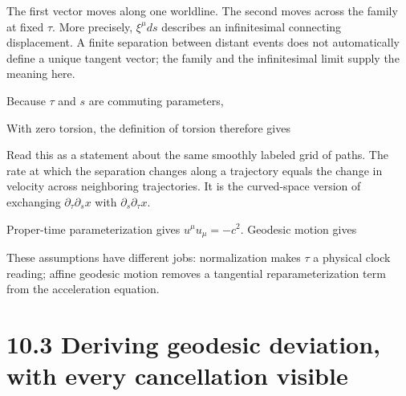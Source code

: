 \documentclass[
  11pt,
  letterpaper,
  oneside,
  openany]{scrbook}
\begin{document}
The first vector moves along one worldline. The second moves across the
family at fixed \(\tau\). More precisely, \(\xi^\mu ds\) describes an
infinitesimal connecting displacement. A finite separation between
distant events does not automatically define a unique tangent vector;
the family and the infinitesimal limit supply the meaning here.

Because \(\tau\) and \(s\) are commuting parameters,

\begin{center}
\begingroup
{}
\ifdim\wd\grmathbox>\linewidth
\resizebox{\linewidth}{!}{\usebox{\grmathbox}}
\else\usebox{\grmathbox}\fi
\endgroup
\end{center}

With zero torsion, the definition of torsion therefore gives

\begin{center}
\begingroup
{}
\ifdim\wd\grmathbox>\linewidth
\resizebox{\linewidth}{!}{\usebox{\grmathbox}}
\else\usebox{\grmathbox}\fi
\endgroup
\end{center}

Read this as a statement about the same smoothly labeled grid of paths.
The rate at which the separation changes along a trajectory equals the
change in velocity across neighboring trajectories. It is the
curved-space version of exchanging \(\partial_\tau\partial_sx\) with
\(\partial_s\partial_\tau x\).

Proper-time parameterization gives \(u^\mu u_\mu=-c^2\). Geodesic motion
gives

\begin{center}
\begingroup
{}
\ifdim\wd\grmathbox>\linewidth
\resizebox{\linewidth}{!}{\usebox{\grmathbox}}
\else\usebox{\grmathbox}\fi
\endgroup
\end{center}

These assumptions have different jobs: normalization makes \(\tau\) a
physical clock reading; affine geodesic motion removes a tangential
reparameterization term from the acceleration equation.

\hypertarget{deriving-geodesic-deviation-with-every-cancellation-visible}{%
\section{10.3 Deriving geodesic deviation, with every cancellation
visible}\label{deriving-geodesic-deviation-with-every-cancellation-visible}}
\end{document}
